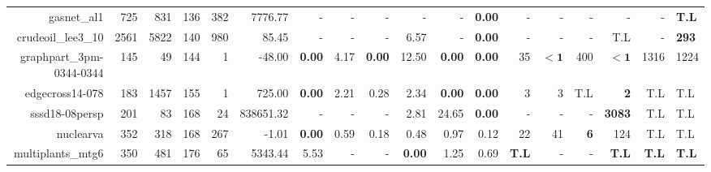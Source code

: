 \begin{table*}[t]
\begin{tabular}{|r|r|r|r|r||r||r|r|r|r|r||r|r|r|r|r|r|}
                       gasnet\_al1 &          725 &           831 &          136 &           382 &             7776.77 &              - &              - &              - &              - &              - &  \textbf{0.00} &                  - &                  - &                  - &                  - &            - & \textbf{T.L} \\ 
                crudeoil\_lee3\_10 &         2561 &          5822 &          140 &           980 &               85.45 &              - &              - &              - &           6.57 &              - &  \textbf{0.00} &                  - &                  - &                  - &                T.L &            - & \textbf{293} \\ 
          graphpart\_3pm-0344-0344 &          145 &            49 &          144 &             1 &              -48.00 &  \textbf{0.00} &           4.17 &  \textbf{0.00} &          12.50 &  \textbf{0.00} &  \textbf{0.00} &                 35 &         $\bm{< 1}$ &                400 &         $\bm{< 1}$ &         1316 &         1224 \\ 
                   edgecross14-078 &          183 &          1457 &          155 &             1 &              725.00 &  \textbf{0.00} &           2.21 &           0.28 &           2.34 &  \textbf{0.00} &  \textbf{0.00} &                  3 &                  3 &                T.L &         \textbf{2} &          T.L &          T.L \\ 
                    sssd18-08persp &          201 &            83 &          168 &            24 &           838651.32 &              - &              - &              - &           2.81 &          24.65 &  \textbf{0.00} &                  - &                  - &                  - &      \textbf{3083} &          T.L &          T.L \\ 
                         nuclearva &          352 &           318 &          168 &           267 &               -1.01 &  \textbf{0.00} &           0.59 &           0.18 &           0.48 &           0.97 &           0.12 &                 22 &                 41 &         \textbf{6} &                124 &          T.L &          T.L \\ 
                 multiplants\_mtg6 &          350 &           481 &          176 &            65 &             5343.44 &           5.53 &              - &              - &  \textbf{0.00} &           1.25 &           0.69 &       \textbf{T.L} &                  - &                  - &       \textbf{T.L} & \textbf{T.L} & \textbf{T.L} \\ 

\end{tabular}
\end{table*}
